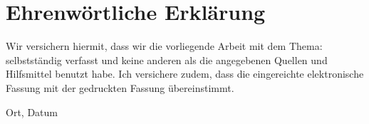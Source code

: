 \clearpage
\chapter*{Ehrenwörtliche Erklärung}


Wir versichern hiermit, dass wir die vorliegende Arbeit
mit dem Thema: \textit{\DerTitelDerArbeit} selbstständig verfasst und keine anderen als die angegebenen Quellen und
Hilfsmittel benutzt habe. Ich versichere zudem,
dass die eingereichte elektronische Fassung mit der gedruckten Fassung übereinstimmt.

\vspace{3cm}
Ort, Datum \hfill \DerAutorDerArbeit
